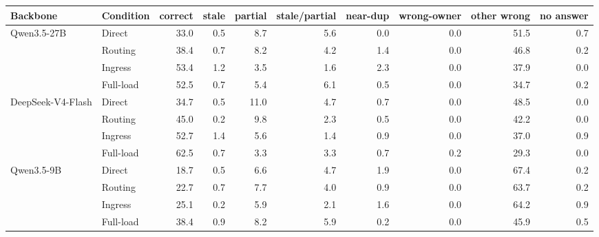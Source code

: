 \begin{tabular}{ll rrrrrrrr}
\toprule
Backbone & Condition & correct & stale & partial & stale/partial & near-dup & wrong-owner & other wrong & no answer \\
\midrule
Qwen3.5-27B & Direct & 33.0 & 0.5 & 8.7 & 5.6 & 0.0 & 0.0 & 51.5 & 0.7 \\
 & Routing & 38.4 & 0.7 & 8.2 & 4.2 & 1.4 & 0.0 & 46.8 & 0.2 \\
 & Ingress & 53.4 & 1.2 & 3.5 & 1.6 & 2.3 & 0.0 & 37.9 & 0.0 \\
 & Full-load & 52.5 & 0.7 & 5.4 & 6.1 & 0.5 & 0.0 & 34.7 & 0.2 \\
\midrule
DeepSeek-V4-Flash & Direct & 34.7 & 0.5 & 11.0 & 4.7 & 0.7 & 0.0 & 48.5 & 0.0 \\
 & Routing & 45.0 & 0.2 & 9.8 & 2.3 & 0.5 & 0.0 & 42.2 & 0.0 \\
 & Ingress & 52.7 & 1.4 & 5.6 & 1.4 & 0.9 & 0.0 & 37.0 & 0.9 \\
 & Full-load & 62.5 & 0.7 & 3.3 & 3.3 & 0.7 & 0.2 & 29.3 & 0.0 \\
\midrule
Qwen3.5-9B & Direct & 18.7 & 0.5 & 6.6 & 4.7 & 1.9 & 0.0 & 67.4 & 0.2 \\
 & Routing & 22.7 & 0.7 & 7.7 & 4.0 & 0.9 & 0.0 & 63.7 & 0.2 \\
 & Ingress & 25.1 & 0.2 & 5.9 & 2.1 & 1.6 & 0.0 & 64.2 & 0.9 \\
 & Full-load & 38.4 & 0.9 & 8.2 & 5.9 & 0.2 & 0.0 & 45.9 & 0.5 \\
\bottomrule
\end{tabular}